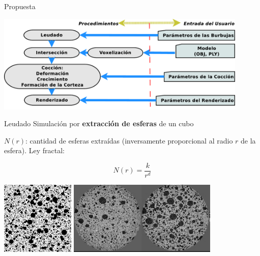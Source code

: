 \documentclass[spanish,unknownkeysallowed]{beamer}
\begin{document}
\begin{frame}{Propuesta}
\centerline{\includegraphics[width=12cm]{../figures/pipeline}}
\end{frame}

\begin{frame}{Leudado}
Simulación por \textbf{extracción de esferas} de un cubo

$N(r)$: cantidad de esferas extraídas (inversamente proporcional al radio $r$ de la esfera). Ley fractal:

\begin{equation*}
N(r) = \frac{k}{r^{d}}
\end{equation*}

\vspace{0.3cm}
\centering
\includegraphics[height=3.5cm]{../figures/bubbles}
\includegraphics[height=3.5cm]{../figures/proving}
\end{frame}
\end{document}
